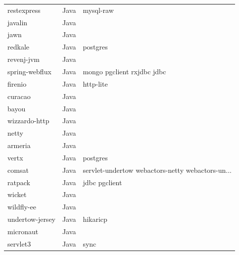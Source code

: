 \begin{longtable}{lll}
    restexpress      & Java        & mysql-raw                                          \\
    javalin          & Java        &                                                    \\
    jawn             & Java        &                                                    \\
    redkale          & Java        & postgres                                           \\
    revenj-jvm       & Java        &                                                    \\
    spring-webflux   & Java        & mongo pgclient rxjdbc jdbc                         \\
    firenio          & Java        & http-lite                                          \\
    curacao          & Java        &                                                    \\
    bayou            & Java        &                                                    \\
    wizzardo-http    & Java        &                                                    \\
    netty            & Java        &                                                    \\
    armeria          & Java        &                                                    \\
    vertx            & Java        & postgres                                           \\
    comsat           & Java        & servlet-undertow webactors-netty webactors-un...   \\
    ratpack          & Java        & jdbc pgclient                                      \\
    wicket           & Java        &                                                    \\
    wildfly-ee       & Java        &                                                    \\
    undertow-jersey  & Java        & hikaricp                                           \\
    micronaut        & Java        &                                                    \\
    servlet3         & Java        & sync                                               \\

\end{longtable}

